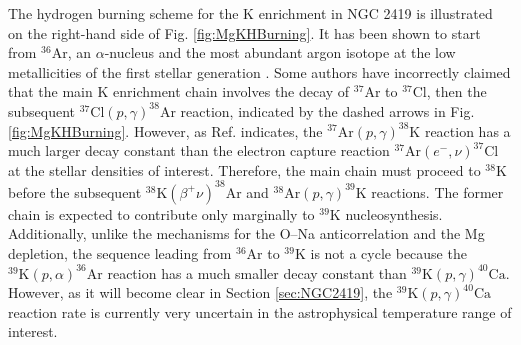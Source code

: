 The hydrogen burning scheme for the K enrichment in NGC 2419 is illustrated on the right-hand side of Fig. \ref{fig:MgKHBurning}. It has been shown to start from $^{36}$Ar, an $\alpha$-nucleus and the most abundant argon isotope at the low metallicities of the first stellar generation \cite{Ventura2012}. Some authors \cite{Ventura2012,Mucciarelli2015} have incorrectly claimed that the main K enrichment chain involves the decay of $^{37}$Ar to $^{37}$Cl, then the subsequent $^{37}\mathrm{Cl}(p,\gamma)^{38}\mathrm{Ar}$ reaction, indicated by the dashed arrows in Fig. \ref{fig:MgKHBurning}. However, as Ref. \cite{Iliadis2016} indicates, the $^{37}\mathrm{Ar}(p,\gamma)^{38}\mathrm{K}$ reaction has a much larger decay constant than the electron capture reaction $^{37}\mathrm{Ar}(e^{-}, \nu)^{37}\mathrm{Cl}$ at the stellar densities of interest. Therefore, the main chain must proceed to $^{38}$K before the subsequent $^{38}\mathrm{K}(\beta^{+}\nu)^{38}\mathrm{Ar}$ and $^{38}\mathrm{Ar}(p,\gamma)^{39}\mathrm{K}$ reactions. The former chain is expected to contribute only marginally to $^{39}$K nucleosynthesis. Additionally, unlike the mechanisms for the O--Na anticorrelation and the Mg depletion, the sequence leading from $^{36}$Ar to $^{39}$K is not a cycle because the $^{39}\mathrm{K}(p,\alpha)^{36}\mathrm{Ar}$ reaction has a much smaller decay constant than $^{39}\mathrm{K}(p,\gamma)^{40}\mathrm{Ca}$. However, as it will become clear in Section \ref{sec:NGC2419}, the $^{39}\mathrm{K}(p,\gamma)^{40}\mathrm{Ca}$ reaction rate is currently very uncertain in the astrophysical temperature range of interest.

